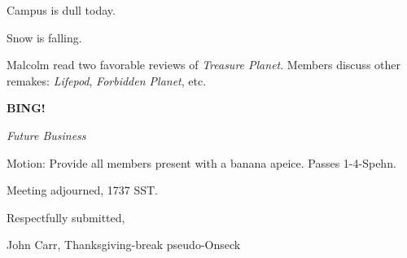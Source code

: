 \documentclass[12pt]{article}
\newcommand{\bing}{{\bf BING!} }
\newcommand{\goto}[1]{\bing \vskip 12pt \centerline{{\em{#1}}}}
\begin{document}
Campus is dull today.


Snow is falling.

Malcolm read two favorable reviews of {\em Treasure Planet}.  Members
discuss other remakes: {\em Lifepod}, {\em Forbidden Planet}, etc.

\goto{Future Business}

Motion: Provide all members present with a banana apeice.
Passes \hbox{1-4-Spehn}.

\vspace{12pt}

\noindent
Meeting adjourned, 1737 SST.

\vspace{18pt}

\centerline{Respectfully submitted,}
\centerline{John Carr, Thanksgiving-break pseudo-Onseck}
\end{document}
